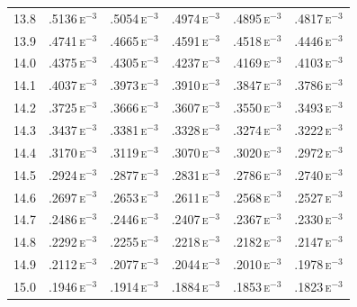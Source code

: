\begin{minipage}[t]{95mm}
{\begin{tabular}{cccccc}
        13.8           & .5136\,\textsc{e}$^{-3}$ & .5054\,\textsc{e}$^{-3}$ & .4974\,\textsc{e}$^{-3}$ & .4895\,\textsc{e}$^{-3}$ & .4817\,\textsc{e}$^{-3}$ \\
        13.9           & .4741\,\textsc{e}$^{-3}$ & .4665\,\textsc{e}$^{-3}$ & .4591\,\textsc{e}$^{-3}$ & .4518\,\textsc{e}$^{-3}$ & .4446\,\textsc{e}$^{-3}$ \\[1.5ex]
        14.0           & .4375\,\textsc{e}$^{-3}$ & .4305\,\textsc{e}$^{-3}$ & .4237\,\textsc{e}$^{-3}$ & .4169\,\textsc{e}$^{-3}$ & .4103\,\textsc{e}$^{-3}$ \\
        14.1           & .4037\,\textsc{e}$^{-3}$ & .3973\,\textsc{e}$^{-3}$ & .3910\,\textsc{e}$^{-3}$ & .3847\,\textsc{e}$^{-3}$ & .3786\,\textsc{e}$^{-3}$ \\
        14.2           & .3725\,\textsc{e}$^{-3}$ & .3666\,\textsc{e}$^{-3}$ & .3607\,\textsc{e}$^{-3}$ & .3550\,\textsc{e}$^{-3}$ & .3493\,\textsc{e}$^{-3}$ \\
        14.3           & .3437\,\textsc{e}$^{-3}$ & .3381\,\textsc{e}$^{-3}$ & .3328\,\textsc{e}$^{-3}$ & .3274\,\textsc{e}$^{-3}$ & .3222\,\textsc{e}$^{-3}$ \\
        14.4           & .3170\,\textsc{e}$^{-3}$ & .3119\,\textsc{e}$^{-3}$ & .3070\,\textsc{e}$^{-3}$ & .3020\,\textsc{e}$^{-3}$ & .2972\,\textsc{e}$^{-3}$ \\
        14.5           & .2924\,\textsc{e}$^{-3}$ & .2877\,\textsc{e}$^{-3}$ & .2831\,\textsc{e}$^{-3}$ & .2786\,\textsc{e}$^{-3}$ & .2740\,\textsc{e}$^{-3}$ \\
        14.6           & .2697\,\textsc{e}$^{-3}$ & .2653\,\textsc{e}$^{-3}$ & .2611\,\textsc{e}$^{-3}$ & .2568\,\textsc{e}$^{-3}$ & .2527\,\textsc{e}$^{-3}$ \\
        14.7           & .2486\,\textsc{e}$^{-3}$ & .2446\,\textsc{e}$^{-3}$ & .2407\,\textsc{e}$^{-3}$ & .2367\,\textsc{e}$^{-3}$ & .2330\,\textsc{e}$^{-3}$ \\
        14.8           & .2292\,\textsc{e}$^{-3}$ & .2255\,\textsc{e}$^{-3}$ & .2218\,\textsc{e}$^{-3}$ & .2182\,\textsc{e}$^{-3}$ & .2147\,\textsc{e}$^{-3}$ \\
        14.9           & .2112\,\textsc{e}$^{-3}$ & .2077\,\textsc{e}$^{-3}$ & .2044\,\textsc{e}$^{-3}$ & .2010\,\textsc{e}$^{-3}$ & .1978\,\textsc{e}$^{-3}$ \\
        15.0           & .1946\,\textsc{e}$^{-3}$ & .1914\,\textsc{e}$^{-3}$ & .1884\,\textsc{e}$^{-3}$ & .1853\,\textsc{e}$^{-3}$ & .1823\,\textsc{e}$^{-3}$ \\
    \end{tabular}
    }
\end{minipage}